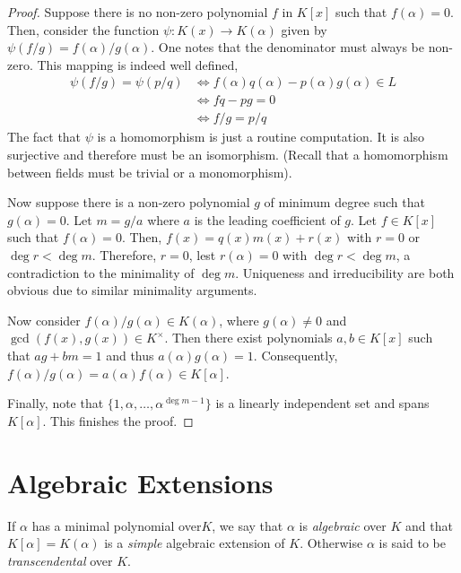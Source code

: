 \begin{proof}
    Suppose there is no non-zero polynomial $f$ in $K[x]$ such that $f(\alpha) = 0$. Then, consider the function $\psi:K(x)\to K(\alpha)$ given by $\psi(f/g) = f(\alpha)/g(\alpha)$. One notes that the denominator must always be non-zero. This mapping is indeed well defined,
    \begin{align*}
        \psi(f/g) = \psi(p/q) &\Leftrightarrow f(\alpha)q(\alpha) - p(\alpha)g(\alpha)\in L\\
        &\Leftrightarrow fq - pg = 0\\
        &\Leftrightarrow f/g = p/q
    \end{align*}
    The fact that $\psi$ is a homomorphism is just a routine computation. It is also surjective and therefore must be an isomorphism. (Recall that a homomorphism between fields must be trivial or a monomorphism).

    Now suppose there is a non-zero polynomial $g$ of minimum degree such that $g(\alpha) = 0$. Let $m = g/a$ where $a$ is the leading coefficient of $g$. Let $f\in K[x]$ such that $f(\alpha) = 0$. Then, $f(x) = q(x)m(x) + r(x)$ with $r = 0$ or $\deg r < \deg m$. Therefore, $r = 0$, lest $r(\alpha) = 0$ with $\deg r < \deg m$, a contradiction to the minimality of $\deg m$. Uniqueness and irreducibility are both obvious due to similar minimality arguments.

    Now consider $f(\alpha)/g(\alpha)\in K(\alpha)$, where $g(\alpha)\ne0$ and $\gcd(f(x), g(x))\in K^\times$. Then there exist polynomials $a,b\in K[x]$ such that $ag + bm = 1$ and thus $a(\alpha)g(\alpha) = 1$. Consequently, $f(\alpha)/g(\alpha) = a(\alpha)f(\alpha)\in K[\alpha]$.

    Finally, note that $\{1,\alpha,\ldots,\alpha^{\deg m - 1}\}$ is a linearly independent set and spans $K[\alpha]$. This finishes the proof.
\end{proof}


\section{Algebraic Extensions}
\begin{definition}[Algebraic]
    If $\alpha$ has a minimal polynomial over$K$, we say that $\alpha$ is \textit{algebraic} over $K$ and that $K[\alpha] = K(\alpha)$ is a \textit{simple} algebraic extension of $K$. Otherwise $\alpha$ is said to be \textit{transcendental} over $K$.
\end{definition}

